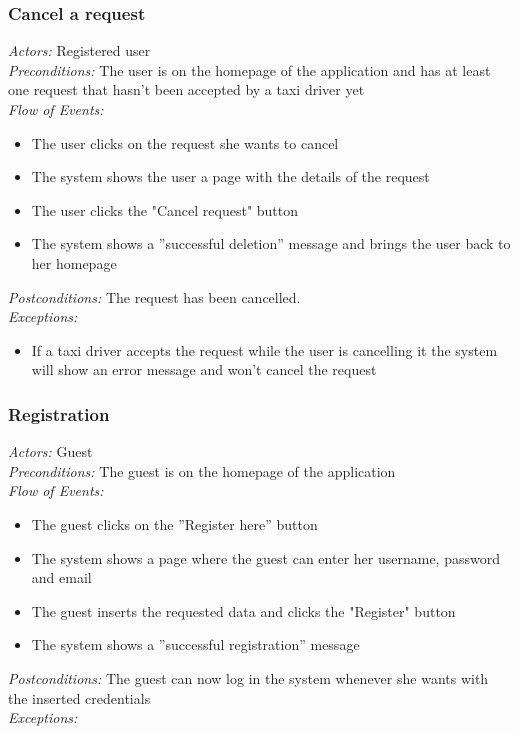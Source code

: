\documentclass{article}
\begin{document}
	\subsubsection{Cancel a request}
	\textit{Actors:} Registered user
	\\\textit{Preconditions:} The user is on the homepage of the application and has at least one request that hasn't been accepted by a taxi driver yet
	\\\textit{Flow of Events:}
	\begin{itemize}
		\item  The user clicks on the request she wants to cancel
		\item  The system shows the user a page with the details of the request
		\item  The user clicks the "Cancel request" button
		\item  The system shows a ''successful deletion'' message and brings the user back to her homepage
	\end{itemize}
	\textit{Postconditions:} The request has been cancelled.
	\\\textit{Exceptions:}
	\begin{itemize} 
		\item If a taxi driver accepts the request while the user is cancelling it the system will show an error message and won't cancel the request
	\end{itemize}
	
	\subsubsection{Registration}
	\textit{Actors:} Guest
	\\\textit{Preconditions:} The guest is on the homepage of the application
	\\\textit{Flow of Events:}
	\begin{itemize}
		\item  The guest clicks on the ''Register here'' button
		\item  The system shows a page where the guest can enter her username, password and email
		\item  The guest inserts the requested data and clicks the "Register" button
		\item  The system shows a ''successful registration'' message 
	\end{itemize}
	\textit{Postconditions:} The guest can now log in the system whenever she wants with the inserted credentials
	\\\textit{Exceptions:}
	
\end{document}

